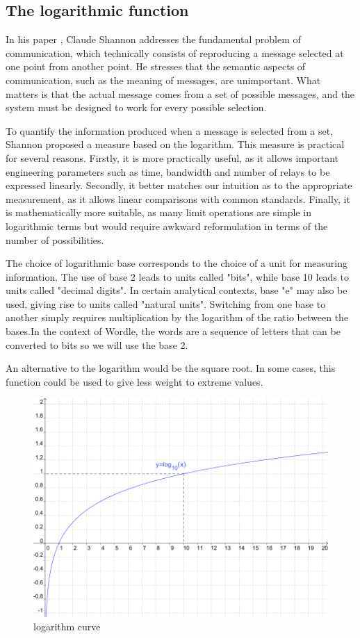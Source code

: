 \subsection{The logarithmic function}

In his paper \cite{shannon1948mathematical}, Claude Shannon addresses the fundamental problem of communication, which technically consists of reproducing a message selected at one point from another point. He stresses that the semantic aspects of communication, such as the meaning of messages, are unimportant. What matters is that the actual message comes from a set of possible messages, and the system must be designed to work for every possible selection.

To quantify the information produced when a message is selected from a set, Shannon proposed a measure based on the logarithm. This measure is practical for several reasons. Firstly, it is more practically useful, as it allows important engineering parameters such as time, bandwidth and number of relays to be expressed linearly. Secondly, it better matches our intuition as to the appropriate measurement, as it allows linear comparisons with common standards. Finally, it is mathematically more suitable, as many limit operations are simple in logarithmic terms but would require awkward reformulation in terms of the number of possibilities.

The choice of logarithmic base corresponds to the choice of a unit for measuring information. The use of base 2 leads to units called "bits", while base 10 leads to units called "decimal digits". In certain analytical contexts, base "e" may also be used, giving rise to units called "natural units". Switching from one base to another simply requires multiplication by the logarithm of the ratio between the bases.In the context of Wordle, the words are a sequence of letters that can be converted to bits so we will use the base 2.

An alternative to the logarithm would be the square root. In some cases, this function could be used to give less weight to extreme values.



\begin{figure}[!ht]
\centering
\includegraphics[scale=0.7]{images/logarithme.png}
\caption{logarithm curve \cite{wiki_log}}
\label{logarithm}
\end{figure}

\newpage
